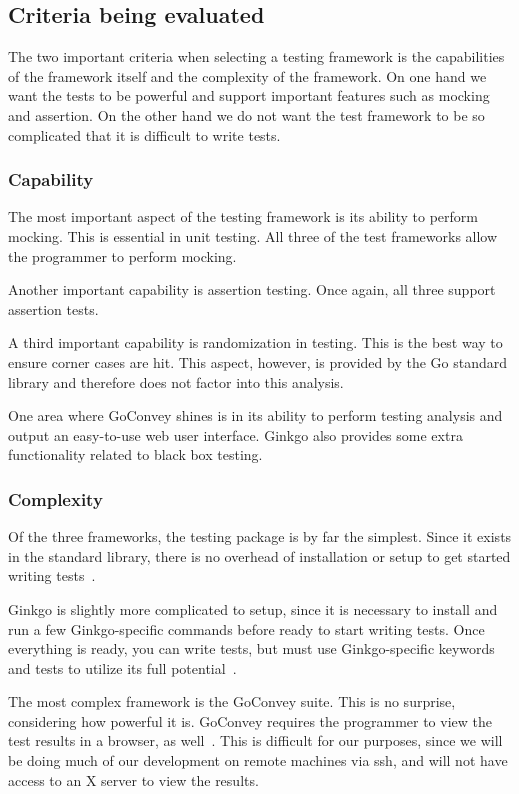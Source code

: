 \documentclass[10pt,letterpaper,onecolumn,draftclsnofoot]{IEEEtran}
\begin{document}
\subsection{Criteria being evaluated}

The two important criteria when selecting a testing framework is the
capabilities of the framework itself and the complexity of the framework. On one
hand we want the tests to be powerful and support important features such as
mocking and assertion. On the other hand we do not want the test framework to be
so complicated that it is difficult to write tests.

\subsubsection{Capability}

The most important aspect of the testing framework is its ability to perform
mocking. This is essential in unit testing. All three of the test frameworks
allow the programmer to perform mocking.

Another important capability is assertion testing. Once again, all three support
assertion tests.

A third important capability is randomization in testing. This is the best way
to ensure corner cases are hit. This aspect, however, is provided by the Go
standard library and therefore does not factor into this analysis.

One area where GoConvey shines is in its ability to perform testing analysis and
output an easy-to-use web user interface. Ginkgo also provides some extra
functionality related to black box testing.

\subsubsection{Complexity}

Of the three frameworks, the testing package is by far the simplest. Since it
exists in the standard library, there is no overhead of installation or setup to
get started writing tests~\cite{testing}.

Ginkgo is slightly more complicated to setup, since it is necessary to install
and run a few Ginkgo-specific commands before ready to start writing tests. Once
everything is ready, you can write tests, but must use Ginkgo-specific keywords
and tests to utilize its full potential~\cite{ginkgo}.

The most complex framework is the GoConvey suite. This is no surprise,
considering how powerful it is. GoConvey requires the programmer to view the
test results in a browser, as well~\cite{goconvey}. This is difficult for our
purposes, since we will be doing much of our development on remote machines via
ssh, and will not have access to an X server to view the results.
\end{document}

